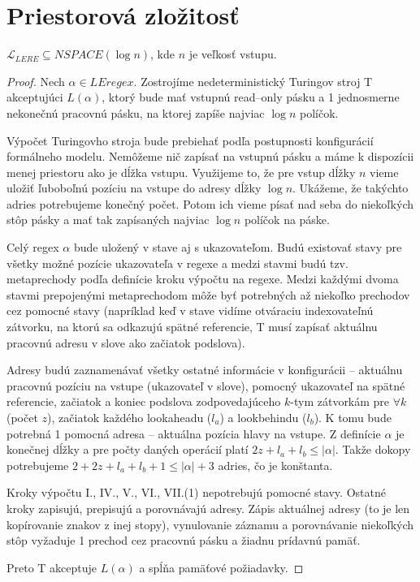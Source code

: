 \documentclass{svk_long_sk}
\def\le{LEregex}
\def\lel{\mathscr{L}_{LERE}}
\begin{document}
\section{Priestorová zložitosť}
\begin{theorem}\label{lere_nspace(logn)}
$\lel \subseteq NSPACE(\log n)$, kde $n$ je veľkosť vstupu.
\end{theorem}
\begin{proof}
Nech $\alpha\in\le$. Zostrojíme nedeterministický Turingov stroj T akceptujúci $L(\alpha)$, ktorý bude mať vstupnú read--only pásku a 1 jednosmerne nekonečnú pracovnú pásku, na ktorej zapíše najviac $\log n$ políčok.

Výpočet Turingovho stroja bude prebiehať podľa postupnosti konfigurácií formálneho modelu. Nemôžeme nič zapísať na vstupnú pásku a máme k dispozícii menej priestoru ako je dĺžka vstupu. Využijeme to, že pre vstup dĺžky $n$ vieme uložiť ľuboboľnú pozíciu na vstupe do adresy dĺžky $\log n$. Ukážeme, že takýchto adries potrebujeme konečný počet. Potom ich vieme písať nad seba do niekoľkých stôp pásky a mať tak zapísaných najviac $\log n$ políčok na páske.

Celý regex $\alpha$ bude uložený v stave aj s ukazovateľom. Budú existovať stavy pre všetky možné pozície ukazovateľa v regexe a medzi stavmi budú tzv. metaprechody podľa definície kroku výpočtu na regexe. Medzi každými dvoma stavmi prepojenými metaprechodom môže byť potrebných až niekoľko prechodov cez pomocné stavy (napríklad keď v stave vidíme otváraciu indexovateľnú zátvorku, na ktorú sa odkazujú spätné referencie, T musí zapísať aktuálnu pracovnú adresu v slove ako začiatok podslova).

Adresy budú zaznamenávať všetky ostatné informácie v konfigurácii -- aktuálnu pracovnú pozíciu na vstupe (ukazovateľ v slove), pomocný ukazovateľ na spätné referencie, začiatok a koniec podslova zodpovedajúceho $k$-tym zátvorkám pre $\forall k$ (počet $z$), začiatok každého lookaheadu ($l_a$) a look\-be\-hindu ($l_b$). K tomu bude potrebná 1 pomocná adresa -- aktuálna pozícia hlavy na vstupe. Z definície $\alpha$ je konečnej dĺžky a pre počty daných operácií platí $2z+l_a+l_b \leq |\alpha|$. Takže dokopy potrebujeme $2+2z+l_a+l_b+1 \leq |\alpha|+3$ adries, čo je konštanta. 

Kroky výpočtu I., IV., V., VI., VII.(1) nepotrebujú pomocné stavy. Ostatné kroky zapisujú, prepisujú a porovnávajú adresy. Zápis aktuálnej adresy (to je len kopírovanie znakov z inej stopy), vynulovanie záznamu a porovnávanie niekoľkých stôp vyžaduje 1 prechod cez pracovnú pásku a žiadnu prídavnú pamäť.

Preto T akceptuje $L(\alpha)$ a spĺňa pamäťové požiadavky.
\end{proof}
\end{document}
